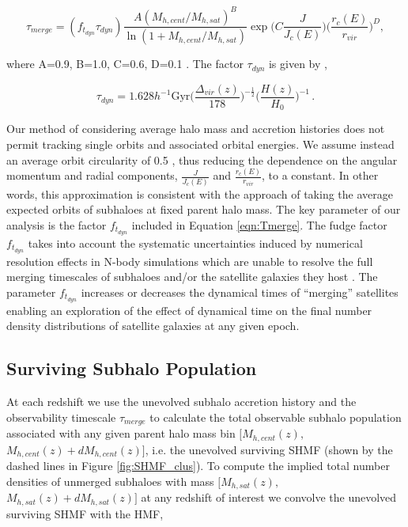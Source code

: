 \begin{equation}
\label{eqn:Tmerge}
\tau_{merge} =
(f_{t_{dyn}}\tau_{dyn}) \frac{A(M_{h, cent}/M_{h,sat})^B}{\ln(1+M_{h, cent}/M_{h, sat})} \exp \Big(C\frac{J}{J_c(E)}\Big) \Big( \frac{r_c(E)}{r_{vir}} \Big)^D,
\end{equation}

where A=0.9, B=1.0, C=0.6, D=0.1 \citep{McCavana2012TheMergers}. The factor $\tau_{dyn}$ is given by \citep{Jiang2016StatisticsFunctions},

\begin{equation}
\label{eqn:tdyn}
\tau_{dyn} = 1.628 h^{-1} \mathrm{Gyr} \Big(\frac{\Delta_{vir}(z)}{178}\Big)^{-\frac{1}{2}} \Big(\frac{H(z)}{H_0}\Big)^{-1} \, .
\end{equation}

Our method of considering average halo mass and accretion histories does not permit tracking single orbits and associated orbital energies. We assume instead an average orbit circularity of 0.5 \citep{Khochfar2006OrbitalHalos}, thus reducing the dependence on the angular momentum and radial components, $\frac{J}{J_c(E)}$ and $\frac{r_c(E)}{r_{vir}}$, to a constant. In other words, this approximation is consistent with the approach of taking the average expected orbits of subhaloes at fixed parent halo mass.
The key parameter of our analysis is the factor $f_{t_{dyn}}$ included in Equation \ref{eqn:Tmerge}.
The fudge factor $f_{t_{dyn}}$ takes into account the systematic uncertainties induced by numerical resolution effects in N-body simulations which are unable to resolve the full merging timescales of subhaloes and/or the satellite galaxies they host \citep{vandenBosch2018DisruptionFiction}. The parameter $f_{t_{dyn}}$ increases or decreases the dynamical times of  ``merging'' satellites enabling an exploration of the effect of dynamical time on the final number density distributions of satellite galaxies at any given epoch.

\subsection{Surviving Subhalo Population}
At each redshift we use the unevolved subhalo accretion history and the observability timescale $\tau_{merge}$ to calculate the total observable subhalo population associated with any given parent halo mass bin $[M_{h,cent}(z),$ $M_{h,cent}(z) + dM_{h,cent}(z)]$, i.e. the unevolved surviving SHMF (shown by the dashed lines in Figure \ref{fig:SHMF_clus}). To compute the implied total number densities of unmerged subhaloes with mass $[M_{h,sat}(z),$ $M_{h,sat}(z) + dM_{h,sat}(z)]$ at any redshift of interest we convolve the unevolved surviving SHMF with the HMF,

